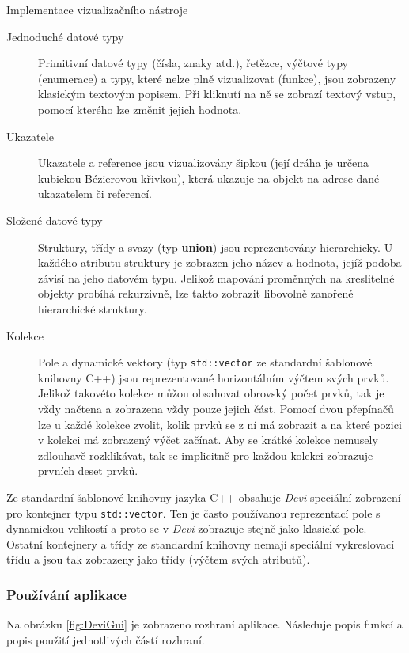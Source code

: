 \documentclass[czech,bachelor,male,python,dept460]{diploma}						%
\begin{document}
\begin{section}{Implementace vizualizačního nástroje}
	\begin{description}
		\item[Jednoduché datové typy] Primitivní datové typy (čísla, znaky atd.), řetězce, výčtové typy (enumerace) a typy, které nelze plně vizualizovat
		(funkce), jsou zobrazeny klasickým textovým popisem. Při kliknutí na ně se zobrazí textový vstup, pomocí kterého lze změnit jejich hodnota.
		\item[Ukazatele] Ukazatele a reference jsou vizualizovány šipkou (její dráha je určena kubickou Bézierovou křivkou), která ukazuje na objekt na adrese
		dané ukazatelem či referencí. %
		\item[Složené datové typy] Struktury, třídy a svazy (typ \textbf{union}) jsou reprezentovány hierarchicky. U každého atributu struktury je zobrazen jeho
		název a hodnota, jejíž podoba závisí na jeho datovém typu. Jelikož mapování proměnných na kreslitelné objekty probíhá rekurzivně, lze takto zobrazit
		libovolně zanořené hierarchické struktury.
		\item[Kolekce] Pole a dynamické vektory (typ \texttt{std::vector} ze standardní šablonové knihovny C++) jsou reprezentované horizontálním výčtem svých prvků.
		Jelikož takovéto kolekce můžou obsahovat obrovský počet prvků, tak je vždy načtena a zobrazena vždy pouze jejich část. Pomocí dvou přepínačů lze u každé
		kolekce zvolit, kolik prvků se z ní má zobrazit a na které pozici v kolekci má zobrazený výčet začínat. Aby se krátké kolekce nemusely zdlouhavě rozklikávat,
		tak se implicitně pro každou kolekci zobrazuje prvních deset prvků.
	\end{description}
	
	Ze standardní šablonové knihovny jazyka C++ obsahuje \textit{Devi} speciální zobrazení pro kontejner typu \texttt{std::vector}. Ten je často používanou
	reprezentací pole s dynamickou velikostí a proto se v \textit{Devi} zobrazuje stejně jako klasické pole. Ostatní kontejnery a třídy ze standardní knihovny
	nemají speciální vykreslovací třídu a jsou tak zobrazeny jako třídy (výčtem svých atributů).
	
	\subsubsection{Používání aplikace}
	Na obrázku \ref{fig:DeviGui} je zobrazeno rozhraní aplikace. Následuje popis funkcí a popis použití jednotlivých částí rozhraní.
	

\end{section}
\end{document}
